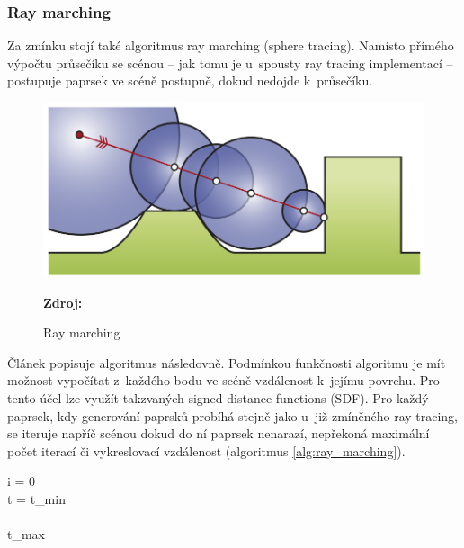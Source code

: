\subsubsection{Ray marching}
Za zmínku stojí také algoritmus ray marching (sphere tracing). Namísto přímého výpočtu průsečíku se scénou -- jak tomu je u~spousty ray tracing implementací -- postupuje paprsek ve scéně postupně, dokud nedojde k~průsečíku.

\begin{figure}[H]
	\centering
	\includegraphics[scale=0.8]{obrazky-figures/ray_marching.png}
	\caption{Ray marching}
	\textbf{Zdroj: \cite{Keinert2014EnhancedST}}
	\label{fig:ray_marching}
\end{figure}

Článek \cite{sphere_tracing} popisuje algoritmus následovně. Podmínkou funkčnosti algoritmu je mít možnost vypočítat z~každého bodu ve scéně vzdálenost k~jejímu povrchu. Pro tento účel lze využít takzvaných signed distance functions (SDF). Pro každý paprsek, kdy generování paprsků probíhá stejně jako u~již zmíněného ray tracing, se iteruje napříč scénou dokud do ní paprsek nenarazí, nepřekoná maximální počet iterací či vykreslovací vzdálenost (algoritmus \ref{alg:ray_marching}).


\begin{center}
	\begin{czechalgorithm}[H] \label{alg:ray_marching}
		i = 0\\
		t = t\_min\\
		\\
		\KwRet t\_max\\
		\caption{Ray marching}
	\end{czechalgorithm}
\end{center}

